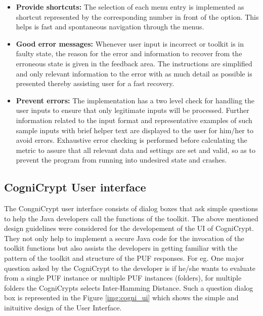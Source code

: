 \begin{itemize}
	\item \textbf{Provide shortcuts:} The selection of each menu entry is implemented as shortcut represented by the corresponding number in front of the option. This helps is fast and spontaneous navigation through the menus.
	\item \textbf{Good error messages:} Whenever user input is incorrect or toolkit is in faulty state, the reason for the error and information to recover from the erroneous state is given in the feedback area. The instructions are simplified and only relevant information to the error with as much detail as possible is presented thereby assisting user for a fast recovery.
	\item \textbf{Prevent errors:} The implementation has a two level check for handling the user inputs to ensure that only legitimate inputs will be processed. Further information related to the input format and representative examples of such sample inputs with brief helper text are displayed to the user for him/her to avoid errors. Exhaustive error checking is performed before calculating the metric to assure that all relevant data and settings are set and valid, so as to prevent
		the program from running into undesired state and crashes.
\end{itemize}

\subsection{CogniCrypt User interface}
The CongniCrypt user interface consists of dialog boxes that ask simple questions to help the Java developers call the functions of the toolkit.
The above mentioned design guidelines were considered for the developement of the UI of CogniCrypt. They not only help to implement a secure Java code for the invocation of the toolkit functions but also assists the developers in getting familiar with the pattern of the toolkit and structure of the PUF responses. For eg. One major question asked by the CogniCrypt to the developer is if he/she wants to evaluate from a single PUF instance or multiple PUF instances (folders), for multiple
folders the CogniCrypts selects Inter-Hamming Distance. Such a question dialog box is represented in the Figure \ref{img:cogni_ui} which shows the simple and inituitive design of the User Interface.\\


